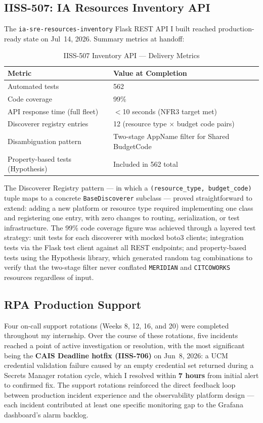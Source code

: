 \subsection{IISS-507: IA Resources Inventory API}

The \texttt{ia-sre-resources-inventory} Flask REST API I built reached production-ready
state on Jul~14, 2026. Summary metrics at handoff:

\begin{table}[ht]
\centering
\caption{IISS-507 Inventory API --- Delivery Metrics}
\label{tab:iiss507_metrics}
\begin{tabular}{p{6.5cm}p{5.5cm}}
\toprule
\textbf{Metric} & \textbf{Value at Completion} \\
\midrule
Automated tests & 562 \\
Code coverage & 99\% \\
API response time (full fleet) & $<$10 seconds (NFR3 target met) \\
Discoverer registry entries & 12 (resource type $\times$ budget code pairs) \\
Disambiguation pattern & Two-stage AppName filter for Shared BudgetCode \\
Property-based tests (Hypothesis) & Included in 562 total \\
\bottomrule
\end{tabular}
\end{table}

The Discoverer Registry pattern --- in which a \texttt{(resource\_type, budget\_code)}
tuple maps to a concrete \texttt{BaseDiscoverer} subclass --- proved straightforward
to extend: adding a new platform or resource type required implementing one class
and registering one entry, with zero changes to routing, serialization, or test
infrastructure. The 99\% code coverage figure was achieved through a layered test
strategy: unit tests for each discoverer with mocked boto3 clients; integration tests
via the Flask test client against all REST endpoints; and property-based tests using
the Hypothesis library, which generated random tag combinations to verify that the
two-stage filter never conflated \texttt{MERIDIAN} and \texttt{CITCOWORKS}
resources regardless of input.

\subsection{RPA Production Support}

Four on-call support rotations (Weeks 8, 12, 16, and 20) were completed
throughout my internship. Over the course of these rotations, five incidents
reached a point of active investigation or resolution, with the most
significant being the \textbf{CAIS Deadline hotfix (IISS-706)} on Jun~8, 2026:
a UCM credential validation failure caused by an empty credential set returned
during a Secrets Manager rotation cycle, which I resolved within \textbf{7 hours} from
initial alert to confirmed fix. The support rotations reinforced the direct
feedback loop between production incident experience and the observability
platform design --- each incident contributed at least one specific monitoring
gap to the Grafana dashboard's alarm backlog.

